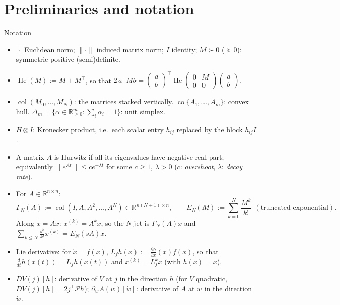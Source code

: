 \documentclass[10pt,aspectratio=169]{beamer}
\newcommand{\R}{\mathbb{R}}
\newcommand{\tr}{^{\top}}
\newcommand{\PP}{\mathcal{P}}
\DeclareMathOperator{\He}{He}
\DeclareMathOperator{\col}{col}
\DeclareMathOperator{\co}{co}
\begin{document}
\section{Preliminaries and notation}

\begin{frame}{Notation}
\small\begin{itemize}
\item $|\cdot|$ Euclidean norm; $\|\cdot\|$ induced matrix norm; $I$ identity; $M\succ0$ ($\succeq0$): symmetric positive (semi)definite.
\item $\He(M):=M+M\tr$, so that $2\,a\tr Mb=\begin{pmatrix}a\\b\end{pmatrix}\tr\He\!\begin{pmatrix}0&M\\0&0\end{pmatrix}\begin{pmatrix}a\\b\end{pmatrix}$.
\item $\col(M_0,\dots,M_N)$: the matrices stacked vertically. $\co\{A_1,\dots,A_m\}$: convex hull. $\Delta_m=\{\alpha\in\R^m_{\ge0}:\sum_i\alpha_i=1\}$: unit simplex.
\item $H\otimes I$: Kronecker product, i.e.\ each scalar entry $h_{ij}$ replaced by the block $h_{ij}I$.
\item A matrix $A$ is \alert{Hurwitz} if all its eigenvalues have negative real part; equivalently $\|e^{At}\|\le ce^{-\lambda t}$ for some $c\ge1$, $\lambda>0$ ($c$: \emph{overshoot}, $\lambda$: \emph{decay rate}).
\item For $A\in\R^{n\times n}$:
\[
\Gamma_N(A):=\col(I,A,A^2,\dots,A^N)\in\R^{n(N+1)\times n},\qquad E_N(M):=\sum_{k=0}^N\frac{M^k}{k!}\ \ (\text{truncated exponential}).
\]
Along $\dot x=Ax$: $x^{(k)}=A^kx$, so the $N$-jet is $\Gamma_N(A)x$ and $\sum_{k\le N}\frac{s^k}{k!}x^{(k)}=E_N(sA)x$.
\item \alert{Lie derivative}: for $\dot x=f(x)$, $L_fh(x):=\frac{\partial h}{\partial x}(x)f(x)$, so that $\frac{d}{dt}h(x(t))=L_fh(x(t))$ and $x^{(k)}=L_f^kx$ (with $h(x)=x$).
\item $DV(j)[h]$: derivative of $V$ at $j$ in the direction $h$ (for $V$ quadratic, $DV(j)[h]=2j\tr\PP h$); $\partial_wA(w)[\dot w]$: derivative of $A$ at $w$ in the direction $\dot w$.
\end{itemize}
\end{frame}
\end{document}
